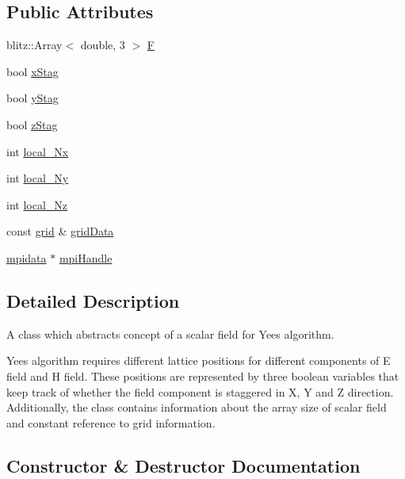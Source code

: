 \subsection*{Public Attributes}
\begin{DoxyCompactItemize}
\item 
blitz\+::\+Array$<$ double, 3 $>$ \hyperlink{classfield_a561c353aad1c91c9d038de482a279d2b}{F}
\item 
bool \hyperlink{classfield_a4d1be454f3b483fb3f8da288707444f5}{x\+Stag}
\item 
bool \hyperlink{classfield_a703fbdda5fa225af078af1d4dfedeeda}{y\+Stag}
\item 
bool \hyperlink{classfield_aa69f393bb8e443c1f4c4eb845a822539}{z\+Stag}
\item 
int \hyperlink{classfield_a5a48dd8a119d060d07c5b4c64ce36211}{local\+\_\+\+Nx}
\item 
int \hyperlink{classfield_a19e5e4f47cd9471b1edf7cf3b059a736}{local\+\_\+\+Ny}
\item 
int \hyperlink{classfield_ac0e32c0b780aa74c30bacbc90c0fbeaf}{local\+\_\+\+Nz}
\item 
const \hyperlink{classgrid}{grid} \& \hyperlink{classfield_a99eb1330d0129bf1e85ca4b26feff704}{grid\+Data}
\item 
\hyperlink{classmpidata}{mpidata} $\ast$ \hyperlink{classfield_adb31d61800661fceb68b660bd50641fb}{mpi\+Handle}
\end{DoxyCompactItemize}


\subsection{Detailed Description}
A class which abstracts concept of a scalar field for Yee\textquotesingle{}s algorithm. 

Yee\textquotesingle{}s algorithm requires different lattice positions for different components of E field and H field. These positions are represented by three boolean variables that keep track of whether the field component is staggered in X, Y and Z direction. Additionally, the class contains information about the array size of scalar field and constant reference to grid information. 

\subsection{Constructor \& Destructor Documentation}
